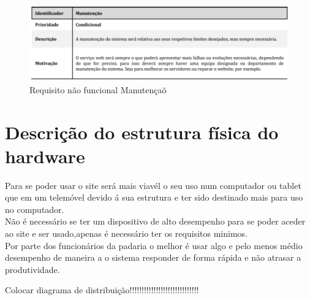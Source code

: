 \begin{figure}[H]
	\centering
	\includegraphics[width=15cm]{requisito_nao_funcional6}
	\caption{Requisito não funcional Manutençaõ}
	\label{fig:requisitonaofuncional6}
\end{figure}

\section{Descrição do estrutura física do hardware}
Para se poder usar o site será mais viavél o seu uso num computador ou tablet que em um telemóvel devido á sua estrutura e ter sido destinado mais para uso no computador. \\
Não é necessário se ter um dispositivo de alto desempenho para se poder aceder ao site e ser usado,apenas é necessário ter os requisitos minimos.\\
Por parte dos funcionários da padaria o melhor é usar algo e pelo menos médio desempenho de maneira a o sistema responder de forma rápida e não atrasar a produtividade.

Colocar diagrama de distribuição!!!!!!!!!!!!!!!!!!!!!!!!!!!!!
